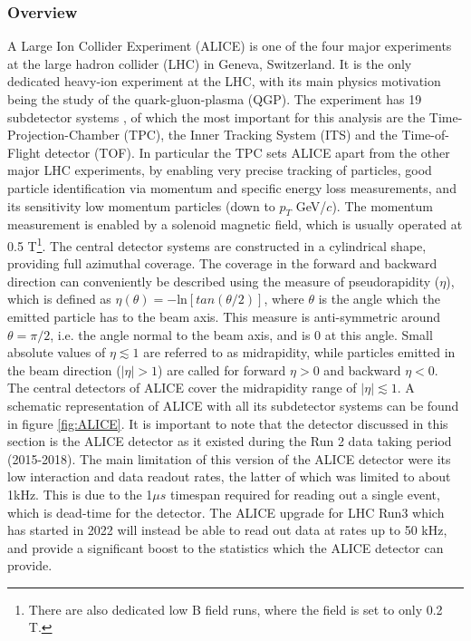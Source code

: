 \subsubsection{Overview}
A Large Ion Collider Experiment (ALICE) is one of the four major experiments at the large hadron collider (LHC) in Geneva, Switzerland. It is the only dedicated heavy-ion experiment at the LHC, with its main physics motivation being the study of the quark-gluon-plasma (QGP). The experiment has 19 subdetector systems \cite{}, of which the most important for this analysis are the Time-Projection-Chamber (TPC), the Inner Tracking System (ITS) and the Time-of-Flight detector (TOF). In particular the TPC sets ALICE apart from the other major LHC experiments, by enabling very precise tracking of particles, good particle identification via momentum and specific energy loss measurements, and its sensitivity low momentum particles (down to $p_T$ GeV/$c$). The momentum measurement is enabled by a solenoid magnetic field, which is usually operated at 0.5 T\footnote{There are also dedicated low B field runs, where the field is set to only 0.2 T.}. The central detector systems are constructed in a cylindrical shape, providing full azimuthal coverage. The coverage in the forward and backward direction can conveniently be described using the measure of pseudorapidity ($\eta$), which is defined as $\eta (\theta) = -\mathrm{ln}[tan(\theta/2)]$, where $\theta$ is the angle which the emitted particle has to the beam axis. This measure is anti-symmetric around $\theta = \pi/2$, i.e. the angle normal to the beam axis, and is 0 at this angle. Small absolute values of $\eta \lesssim 1$ are referred to as midrapidity, while particles emitted in the beam direction ($|\eta| > 1$) are called for forward $\eta >0$ and backward $\eta < 0$. The central detectors of ALICE cover the midrapidity range of $|\eta|\lesssim 1$. A schematic representation of ALICE with all its subdetector systems can be found in figure \ref{fig:ALICE}. It is important to note that the detector discussed in this section is the ALICE detector as it existed during the Run 2 data taking period (2015-2018). The main limitation of this version of the ALICE detector were its low interaction and data readout rates, the latter of which was limited to about 1kHz. This is due to the 1$\mu s$ timespan required for reading out a single event, which is dead-time for the detector. The ALICE upgrade for LHC Run3 which has started in 2022 will instead be able to read out data at rates up to 50 kHz, and provide a significant boost to the statistics which the ALICE detector can provide.

